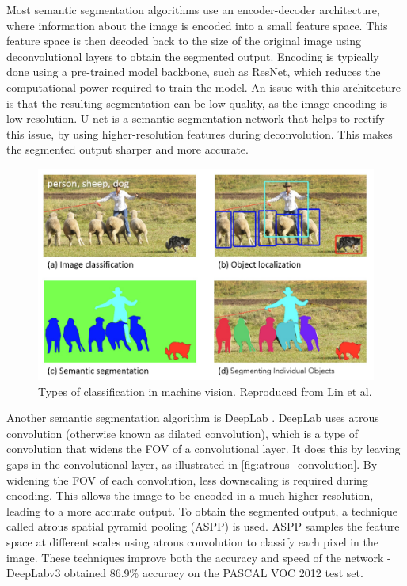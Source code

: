 \documentclass[12pt]{article}
\begin{document}
Most semantic segmentation algorithms use an encoder-decoder architecture, where information about the image is encoded into a small feature space.
This feature space is then decoded back to the size of the original image using deconvolutional layers to obtain the segmented output.
Encoding is typically done using a pre-trained model backbone, such as ResNet, which reduces the computational power required to train
the model.
An issue with this architecture is that the resulting segmentation can be low quality, as the image encoding is low resolution.
U-net \cite{ronnebergerUNetConvolutionalNetworks2015} is a semantic segmentation network that helps to rectify this issue,
by using higher-resolution features during deconvolution.
This makes the segmented output sharper and more accurate.

\begin{figure}[H]
    \centering
    \includegraphics[width=0.6\linewidth]{images/classification_types.png}
    \caption{Types of classification in machine vision. Reproduced from Lin et al. \cite{linMicrosoftCOCOCommon2014}}
    \label{fig:classification_types}
\end{figure}

Another semantic segmentation algorithm is DeepLab \cite{chenSemanticImageSegmentation2014}\cite{chenDeepLabSemanticImage2016}\cite{chenRethinkingAtrousConvolution2017}.
DeepLab uses atrous convolution (otherwise known as dilated convolution), which is a type of convolution that widens the FOV of a convolutional layer.
It does this by leaving gaps in the convolutional layer, as illustrated in \cref{fig:atrous_convolution}.
By widening the FOV of each convolution, less downscaling is required during encoding. This allows the image to be encoded in a much higher resolution,
leading to a more accurate output.
To obtain the segmented output, a technique called atrous spatial pyramid pooling (ASPP) is used. ASPP samples the feature space at different
scales using atrous convolution to classify each pixel in the image.
These techniques improve both the accuracy and speed of the network - DeepLabv3 obtained 86.9\% accuracy on the PASCAL VOC 2012 test set.
\end{document}
